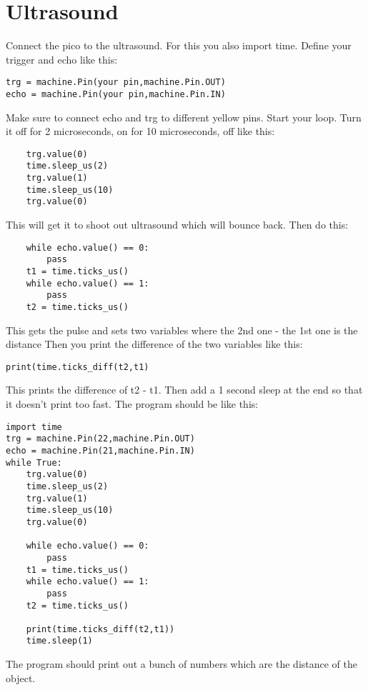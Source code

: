 \documentclass[12pt]{article}
\begin{document}
\section{Ultrasound}
Connect the pico to the ultrasound.
For this you also import time.
Define your trigger and echo like this:
\begin{verbatim}
trg = machine.Pin(your pin,machine.Pin.OUT)
echo = machine.Pin(your pin,machine.Pin.IN)
\end{verbatim}
Make sure to connect echo and trg to different yellow pins.
Start your loop.
Turn it off for 2 microseconds, on for 10 microseconds, off like this:
\begin{verbatim}
    trg.value(0)
    time.sleep_us(2)
    trg.value(1)
    time.sleep_us(10)
    trg.value(0)
\end{verbatim}
This will get it to shoot out ultrasound which will bounce back.
Then do this:
\begin{verbatim}
    while echo.value() == 0:
        pass
    t1 = time.ticks_us()
    while echo.value() == 1:
        pass
    t2 = time.ticks_us()
\end{verbatim}
This gets the pulse and sets two variables where the 2nd one - the 1st one is the distance
Then you print the difference of the two variables like this:
\begin{verbatim}
print(time.ticks_diff(t2,t1)
\end{verbatim}
This prints the difference of t2 - t1.
Then add a 1 second sleep at the end so that it doesn't print too fast.
The program should be like this:
\begin{verbatim}
import time
trg = machine.Pin(22,machine.Pin.OUT)
echo = machine.Pin(21,machine.Pin.IN)
while True:
    trg.value(0)
    time.sleep_us(2)
    trg.value(1)
    time.sleep_us(10)
    trg.value(0)

    while echo.value() == 0:
        pass
    t1 = time.ticks_us()
    while echo.value() == 1:
        pass
    t2 = time.ticks_us()

    print(time.ticks_diff(t2,t1))
    time.sleep(1)
\end{verbatim}
The program should print out a bunch of numbers which are the distance of the object.
\end{document}
